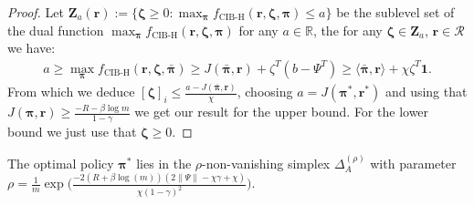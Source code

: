 \begin{proof}
    Let $\bm{Z}_a(\bm{r}) := \{ \bm{\zeta} \geq 0 : \max_{\bm{\pi}}f_\text{CIB-H}(\bm{r},\bm{\zeta},\bm{\pi}) \leq a \}$ be the sublevel set of the dual function $\max_{\bm{\pi}}f_\text{CIB-H}(\bm{r},\bm{\zeta},\bm{\pi})$ for any $a \in \mathbb{R}$, the for any $\bm{\zeta} \in \bm{Z}_a$, $\bm{r} \in \mathcal{R}$ we have:
    \begin{align*}
        a \geq \max_{\bm{\pi}}f_\text{CIB-H}(\bm{r},\bm{\zeta},\bar{\bm{\pi}}) \geq J( \bar{\bm{\pi}},\bm{r}) + \zeta^T (b - \Psi^T) \geq \langle \bar{\bm{\pi}},\bm{r}\rangle + \chi \zeta^T \mathbf{1}.
    \end{align*}
    From which we deduce $[\bm{\zeta}]_i \leq \frac{a-J( \bar{\bm{\pi}},\bm{r})}{\chi}$, choosing $a=J(\bm{\pi}^*,\bm{r}^*)$ and using that $J(\bm{\pi},\bm{r}) \geq \frac{-R -\beta \log m}{1-\gamma}$ we get our result for the upper bound. For the lower bound we just use that $\bm{\zeta} \geq 0$.
\end{proof}



\begin{proposition}
    \label{prop:optimal_solution_in_simplex} The optimal policy $\bm{\pi}^*$ lies in the $\rho$-non-vanishing simplex $\Delta_A^{(\rho)}$ with parameter $\rho = \frac{1}{m} \exp \Big(\frac{-2\left(R + \beta \log{\left(m \right)}\right) \left(2  \|\Psi\| - \chi \gamma + \chi\right)}{\chi \left(1- \gamma\right)^{2}} \Big)$.
\end{proposition}


